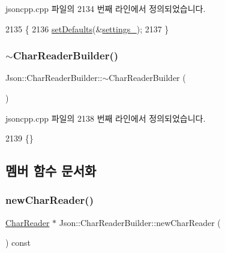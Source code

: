 jsoncpp.\+cpp 파일의 2134 번째 라인에서 정의되었습니다.


\begin{DoxyCode}
2135 \{
2136   \hyperlink{class_json_1_1_char_reader_builder_a03ff031e06aabff989ab4addc87294ab}{setDefaults}(&\hyperlink{class_json_1_1_char_reader_builder_ac69b7911ad64c171c51ebaf2ea26d958}{settings\_});
2137 \}
\end{DoxyCode}
\mbox{\label{class_json_1_1_char_reader_builder_ae8226503f5b947e9d618c39dd992c85c}} 
\subsubsection{\texorpdfstring{$\sim$\+Char\+Reader\+Builder()}{~CharReaderBuilder()}}
{\footnotesize\ttfamily Json\+::\+Char\+Reader\+Builder\+::$\sim$\+Char\+Reader\+Builder (\begin{DoxyParamCaption}{ }\end{DoxyParamCaption})}



jsoncpp.\+cpp 파일의 2138 번째 라인에서 정의되었습니다.


\begin{DoxyCode}
2139 \{\}
\end{DoxyCode}


\subsection{멤버 함수 문서화}
\mbox{\label{class_json_1_1_char_reader_builder_a3a262fcc76c1eb8eebfd4718fb4e9722}} 
\subsubsection{\texorpdfstring{new\+Char\+Reader()}{newCharReader()}}
{\footnotesize\ttfamily \hyperlink{class_json_1_1_char_reader}{Char\+Reader} $\ast$ Json\+::\+Char\+Reader\+Builder\+::new\+Char\+Reader (\begin{DoxyParamCaption}{ }\end{DoxyParamCaption}) const\hspace{0.3cm}{\ttfamily [virtual]}}



